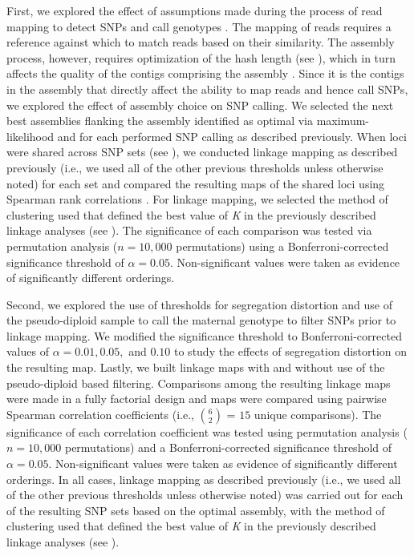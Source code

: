 \documentclass[11pt]{article}
\begin{document}
First, we explored the effect of assumptions made during the process of read mapping to detect SNPs and call genotypes 
\citep[cf.][]{Pool:2010}. The mapping of reads requires a reference against which to match reads based on their similarity. 
The assembly process, however, requires optimization of the hash length (see ), 
which in turn affects the quality of the contigs comprising the assembly \citep{Earl:2011gt,Salzberg:2011fr,Bradnam:2013uu}.  
Since it is the contigs in the assembly that directly affect the ability to map reads and hence call SNPs, we explored the effect 
of assembly choice on SNP calling. We selected the next best assemblies flanking the assembly identified as optimal via maximum-likelihood 
and for each performed SNP calling as described previously. When loci were shared across SNP sets (see ), we 
conducted linkage mapping as described previously (i.e., we used all of the other previous thresholds unless otherwise noted) for each 
set and compared the resulting maps of the shared loci using Spearman rank correlations \citep{Spearman:1904}. For linkage mapping, we selected 
the method of clustering used that defined the best value of \textit{K} in the previously described linkage analyses (see ).  
The significance of each comparison was tested via permutation analysis ($n = 10,000$ permutations) using a Bonferroni-corrected significance 
threshold of $\alpha = 0.05$. Non-significant values were taken as evidence of significantly different orderings.

Second, we explored the use of thresholds for segregation distortion and 
use of the pseudo-diploid sample to call the maternal genotype to filter SNPs prior to linkage mapping. 
We modified the significance threshold to Bonferroni-corrected values of $\alpha = 0.01, 0.05,$ 
and $0.10$ to study the effects of segregation distortion on the resulting map. 
Lastly, we built linkage maps with and without use of the pseudo-diploid based filtering. Comparisons among the resulting linkage 
maps were made in a fully factorial design and maps were compared using pairwise Spearman correlation coefficients 
(i.e., {$6 \choose 2$} = $15$ unique comparisons). The significance of each correlation coefficient 
was tested using permutation analysis ($n = 10,000$ permutations) and a Bonferroni-corrected significance threshold of $\alpha = 0.05$. 
Non-significant values were taken as evidence of significantly different orderings. In all cases, linkage mapping as described previously 
(i.e., we used all of the other previous thresholds unless otherwise noted) was carried out for each of the resulting SNP sets based on 
the optimal assembly, with the method of clustering used that defined the best value of \textit{K} in the previously described 
linkage analyses (see ).
\end{document}
